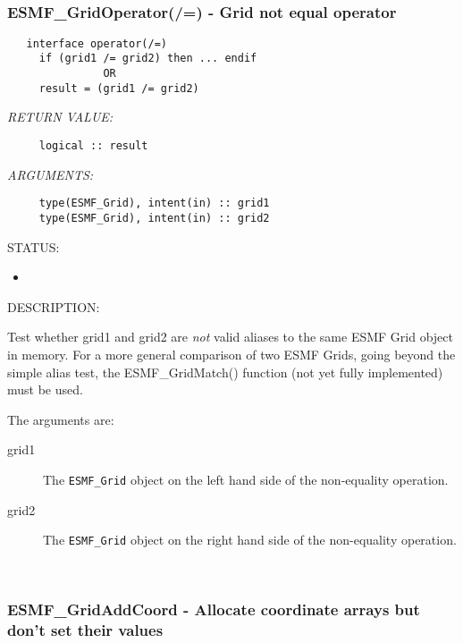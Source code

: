  
\mbox{}\hrulefill\ 
 
\subsubsection [ESMF\_GridOperator(/=)] {ESMF\_GridOperator(/=) - Grid not equal operator}


  
\begin{verbatim}   interface operator(/=)
     if (grid1 /= grid2) then ... endif
               OR
     result = (grid1 /= grid2)\end{verbatim}{\em RETURN VALUE:}
\begin{verbatim}     logical :: result\end{verbatim}{\em ARGUMENTS:}
\begin{verbatim}     type(ESMF_Grid), intent(in) :: grid1
     type(ESMF_Grid), intent(in) :: grid2\end{verbatim}
{\sf STATUS:}
   \begin{itemize}
   \item{}
   \end{itemize}
  
{\sf DESCRIPTION:\\ }


     Test whether grid1 and grid2 are {\it not} valid aliases to the
     same ESMF Grid object in memory. For a more general comparison of two ESMF
     Grids, going beyond the simple alias test, the ESMF\_GridMatch() function
     (not yet fully implemented) must be used.
  
     The arguments are:
     \begin{description}
     \item[grid1]
       The {\tt ESMF\_Grid} object on the left hand side of the non-equality
       operation.
     \item[grid2]
       The {\tt ESMF\_Grid} object on the right hand side of the non-equality
       operation.
     \end{description}
   
 
\mbox{}\hrulefill\ 
 
\subsubsection [ESMF\_GridAddCoord] {ESMF\_GridAddCoord - Allocate coordinate arrays but don't set their values}


